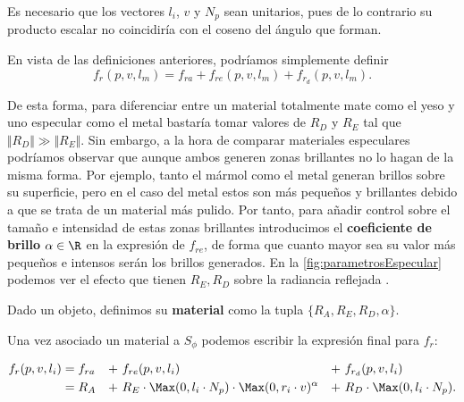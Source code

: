 \begin{observacion}
    Es necesario que los vectores $l_i$, $v$ y $N_p$ sean unitarios, pues de lo contrario su producto escalar no coincidiría con el coseno del ángulo que forman.
\end{observacion}

En vista de las definiciones anteriores, podríamos simplemente definir
\begin{equation*}
    f_r(p,v,l_m) = f_{ra}+f_{re}(p,v,l_m) + f_{r_d}(p,v,l_m).
\end{equation*}

De esta forma, para diferenciar entre un material totalmente mate como el yeso y uno especular como el metal bastaría tomar valores de $R_D$ y $R_E$ tal que $\Vert R_D\Vert \gg \Vert R_E\Vert$. Sin embargo, a la hora de comparar materiales especulares podríamos observar que aunque ambos generen zonas brillantes no lo hagan de la misma forma. Por ejemplo, tanto el mármol como el metal generan brillos sobre su superficie, pero en el caso del metal estos son más pequeños y brillantes debido a que se trata de un material más pulido. Por tanto, para añadir control sobre el tamaño e intensidad de estas zonas brillantes introducimos el \textbf{coeficiente de brillo} $\alpha \in \R$ en la expresión de $f_{re}$, de forma que cuanto mayor sea su valor más pequeños e intensos serán los brillos generados. En la \autoref{fig:parametrosEspecular} podemos ver el efecto que tienen $R_E,R_D$ sobre la radiancia reflejada \cite{especular}.\newline

\begin{definicion}
    Dado un objeto, definimos su \textbf{material} como la tupla $\{R_A,R_E,R_D,\alpha \}$.
\end{definicion}

Una vez asociado un material a $S_{\phi}$ podemos escribir la expresión final para $f_r$:

\begin{align}\label{eq:fr}
    f_r(p,v,l_i) &= f_{ra} &+\ & f_{re}(p,v,l_i) &+\ &f_{r_d}(p,v,l_i)\\
                 &= R_A    &+\ & R_E \cdot \Max(0,l_i\cdot N_p) \cdot \Max(0,r_i \cdot v)^{\alpha} &+\  &R_D\cdot \Max(0,l_i\cdot N_p). 
\end{align}


